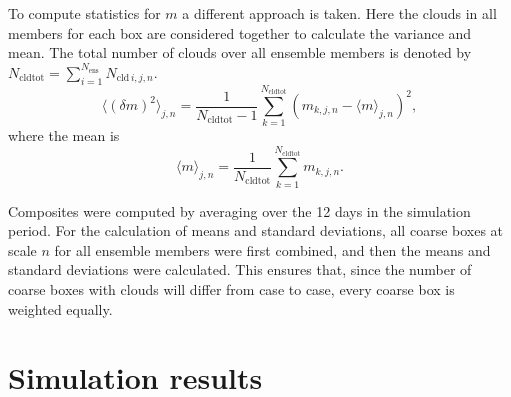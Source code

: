 \documentclass[a4paper, 12pt]{article}
\begin{document}
To compute statistics for $m$ a different approach is taken. Here the clouds in all members for each box are considered together to calculate the variance and mean. The total number of clouds over all ensemble members is denoted by $N_{\mathrm{cldtot}} = \sum_{i=1}^{N_{\mathrm{ens}}} N_{\mathrm{cld}\,i,j,n}$.
\begin{equation} \label{eq:calc_varm}
 \langle (\delta m )^2 \rangle_{j,n} = \frac{1}{N_{\mathrm{cldtot}}-1} \sum_{k=1}^{N_{\mathrm{cldtot}}} (m_{k,j,n} - \langle m \rangle_{j,n})^2,
\end{equation}
where the mean is
\begin{equation} \label{eq:calc_meanm}
 \langle m \rangle_{j,n} = \frac{1}{N_{\mathrm{cldtot}}} \sum_{k=1}^{N_{\mathrm{cldtot}}} m_{k,j,n}.
\end{equation}
% 

Composites were computed by averaging over the 12 days in the simulation period. For the calculation of means and standard deviations, all coarse boxes at scale $n$ for all ensemble members were first combined, and then the means and standard deviations were calculated. This ensures that, since the number of coarse boxes with clouds will differ from case to case, every coarse box is weighted equally.


\section{Simulation results}
\end{document}
